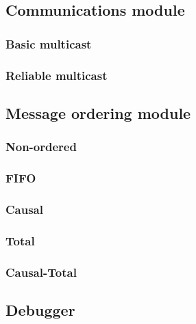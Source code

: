 \documentclass[titlepage, twocolumn, a4paper, 10pt]{article}
\begin{document}
\subsection{Communications module}\label{sec:communications-module}
\subsubsection{Basic multicast}\label{sec:basic-multicast}
\subsubsection{Reliable multicast}\label{sec:reliable-multicast}


\subsection{Message ordering module}\label{sec:message-ordering-module}
\subsubsection{Non-ordered}\label{sec:-non-ordered}
\subsubsection{FIFO}\label{sec:fifo}
\subsubsection{Causal}\label{sec:causal}
\subsubsection{Total}\label{sec:total}
\subsubsection{Causal-Total}\label{sec:causal-total}


\subsection{Debugger}\label{sec:debugger}

\end{document}
